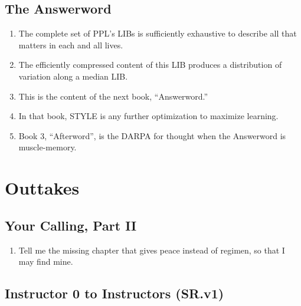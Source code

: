 \documentclass[
]{book}
\providecommand{\tightlist}{%
  \setlength{\itemsep}{0pt}\setlength{\parskip}{0pt}}
\begin{document}
\hypertarget{the-answerword}{%
\subsection{The Answerword}\label{the-answerword}}

\begin{enumerate}
\def\labelenumi{\arabic{enumi}.}
\setcounter{enumi}{94}
\item
  The complete set of PPL's LIBs is sufficiently exhaustive to describe all that matters in each and all lives.
\item
  The efficiently compressed content of this LIB produces a distribution of variation along a median LIB.
\item
  This is the content of the next book, ``Answerword.''
\item
  In that book, STYLE is any further optimization to maximize learning.
\item
  Book 3, ``Afterword'', is the DARPA for thought when the Answerword is muscle-memory.
\end{enumerate}

\hypertarget{outtakes}{%
\section{Outtakes}\label{outtakes}}

\hypertarget{your-calling-part-ii}{%
\subsection{Your Calling, Part II}\label{your-calling-part-ii}}

\begin{enumerate}
\def\labelenumi{\arabic{enumi}.}
\setcounter{enumi}{3}
\tightlist
\item
  Tell me the missing chapter
  that gives peace instead of regimen,
  so that I may find mine.
\end{enumerate}

\hypertarget{instructor-0-to-instructors-sr.v1}{%
\subsection{Instructor 0 to Instructors (SR.v1)}\label{instructor-0-to-instructors-sr.v1}}
\end{document}
